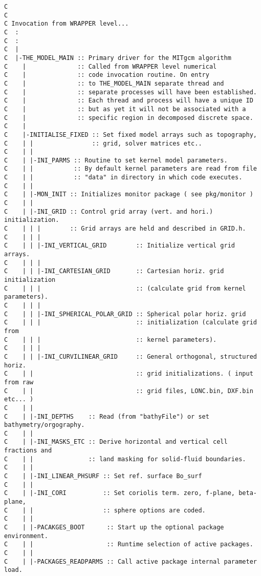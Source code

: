 \begin{verbatim}
C
C
C Invocation from WRAPPER level...
C  :
C  :
C  |
C  |-THE_MODEL_MAIN :: Primary driver for the MITgcm algorithm
C    |              :: Called from WRAPPER level numerical
C    |              :: code invocation routine. On entry
C    |              :: to THE_MODEL_MAIN separate thread and
C    |              :: separate processes will have been established.
C    |              :: Each thread and process will have a unique ID
C    |              :: but as yet it will not be associated with a
C    |              :: specific region in decomposed discrete space.
C    |
C    |-INITIALISE_FIXED :: Set fixed model arrays such as topography, 
C    | |                :: grid, solver matrices etc..
C    | |              
C    | |-INI_PARMS :: Routine to set kernel model parameters.
C    | |           :: By default kernel parameters are read from file 
C    | |           :: "data" in directory in which code executes.
C    | |
C    | |-MON_INIT :: Initializes monitor package ( see pkg/monitor )
C    | |
C    | |-INI_GRID :: Control grid array (vert. and hori.) initialization.
C    | | |        :: Grid arrays are held and described in GRID.h.
C    | | |
C    | | |-INI_VERTICAL_GRID        :: Initialize vertical grid arrays.
C    | | |
C    | | |-INI_CARTESIAN_GRID       :: Cartesian horiz. grid initialization
C    | | |                          :: (calculate grid from kernel parameters).
C    | | |
C    | | |-INI_SPHERICAL_POLAR_GRID :: Spherical polar horiz. grid 
C    | | |                          :: initialization (calculate grid from 
C    | | |                          :: kernel parameters).
C    | | |
C    | | |-INI_CURVILINEAR_GRID     :: General orthogonal, structured horiz.
C    | |                            :: grid initializations. ( input from raw
C    | |                            :: grid files, LONC.bin, DXF.bin etc... )
C    | |
C    | |-INI_DEPTHS    :: Read (from "bathyFile") or set bathymetry/orgography.
C    | |
C    | |-INI_MASKS_ETC :: Derive horizontal and vertical cell fractions and
C    | |               :: land masking for solid-fluid boundaries.
C    | |
C    | |-INI_LINEAR_PHSURF :: Set ref. surface Bo_surf
C    | |
C    | |-INI_CORI          :: Set coriolis term. zero, f-plane, beta-plane,
C    | |                   :: sphere options are coded.
C    | |
C    | |-PACAKGES_BOOT      :: Start up the optional package environment.
C    | |                    :: Runtime selection of active packages.
C    | |
C    | |-PACKAGES_READPARMS :: Call active package internal parameter load.

\end{verbatim}
